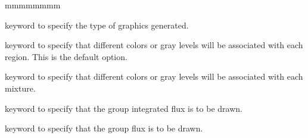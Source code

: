 \begin{ListeDeDescription}{mmmmmmmm}
\item[\moc{TYPE}] keyword to specify the type of graphics generated. 

\item[\moc{REGION}] keyword to specify that different colors or gray levels will be associated with each region. This 
is the default option. 

\item[\moc{MIXTURE}] keyword to specify that different colors or gray levels will be associated with each mixture. 

\item[\moc{FLUX}] keyword to specify that the group integrated flux is to be drawn. 

\item[\moc{MGFLUX}] keyword to specify that the group flux is to be drawn.

\end{ListeDeDescription}

\eject
